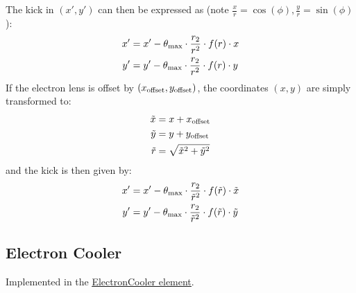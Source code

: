 The kick in $(x',y')$ can then be expressed as (note $\frac{x}{r}=\cos(\phi),\frac{y}{r}=\sin(\phi)$):
\begin{align}
x'&=x'-\theta_{\rm max}\cdot\frac{r_2}{r^2}\cdot f(r)\cdot x\\
y'&=y'-\theta_{\rm max}\cdot\frac{r_2}{r^2}\cdot f(r)\cdot y
\end{align}
If the electron lens is offset by $(x_{\rm offset},y_{\rm offset})$, the coordinates $(x,y)$ are simply transformed to:
\begin{align}
\tilde x&=x+x_{\rm offset}\\
\tilde y&=y+y_{\rm offset}\\
\tilde r&=\sqrt{\tilde x^2+\tilde y^2}
\end{align}
and the kick is then given by:
\begin{align}
x'&=x'-\theta_{\rm max}\cdot\frac{r_2}{\tilde r^2}\cdot f(\tilde r)\cdot \tilde x\\
y'&=y'-\theta_{\rm max}\cdot\frac{r_2}{\tilde r^2}\cdot f(\tilde r)\cdot \tilde y
\end{align}

\subsection{Electron Cooler}

Implemented in the \href{https://xsuite.readthedocs.io/en/latest/apireference.html#electroncooler}{\underline{ElectronCooler element}}.
~\\

